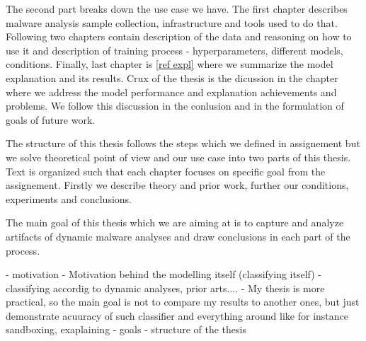 The second part breaks down the use case we have. The first chapter  describes malware analysis sample collection, infrastructure and tools used to do that. Following two chapters contain description of the data and reasoning on how to use it and description of training process - hyperparameters, different models, conditions. Finally, last chapter is \ref{ref expl} where we summarize the model explanation and its results. Crux of the thesis is the dicussion in the chapter  where we address the model performance and explanation achievements and problems. We follow this discussion in the conlusion and in the formulation of goals of future work.



The structure of this thesis follows the steps which we defined in assignement but we solve theoretical point of view and our use case into two parts of this thesis.
Text is organized such that each chapter focuses on specific goal from the assignement. Firstly we describe theory and prior work, further our conditions, experiments and conclusions.

The main goal of this thesis which we are aiming at is to capture and analyze artifacts of dynamic malware analyses and draw conclusions in each part of the process. 

- motivation
- Motivation behind the modelling itself (classifying itself)
  - classifying accordig to dynamic analyses, prior arts....
  - My thesis is more practical, so the main goal is not to compare my results to another ones, but just demonstrate acuuracy of such classifier and everything around like for instance sandboxing, exaplaining
- goals
- structure of the thesis
